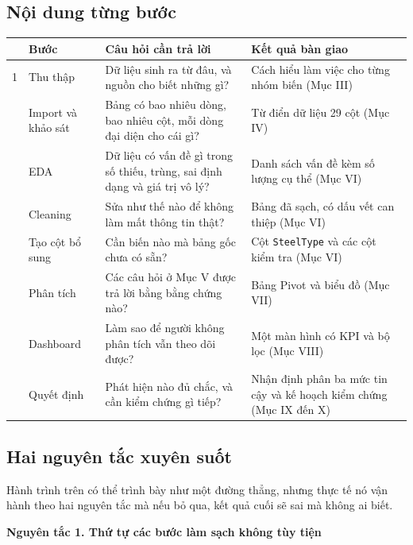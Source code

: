 \documentclass[12pt]{article}
\begin{document}
\subsection{Nội dung từng bước}

\begin{center}
\small
\begin{tabular}{@{}p{0.45cm} p{2.6cm} p{5.9cm} p{6.5cm}@{}}
\toprule
 & \textbf{Bước} & \textbf{Câu hỏi cần trả lời} & \textbf{Kết quả bàn giao} \\
\midrule
1 & Thu thập & Dữ liệu sinh ra từ đâu, và nguồn cho biết những gì? & Cách hiểu làm việc cho từng nhóm biến (Mục III) \\
\addlinespace[3pt]
2 & Import và khảo sát & Bảng có bao nhiêu dòng, bao nhiêu cột, mỗi dòng đại diện cho cái gì? & Từ điển dữ liệu 29 cột (Mục IV) \\
\addlinespace[3pt]
3 & EDA & Dữ liệu có vấn đề gì trong số thiếu, trùng, sai định dạng và giá trị vô lý? & Danh sách vấn đề kèm số lượng cụ thể (Mục VI) \\
\addlinespace[3pt]
4 & Cleaning & Sửa như thế nào để không làm mất thông tin thật? & Bảng đã sạch, có dấu vết can thiệp (Mục VI) \\
\addlinespace[3pt]
5 & Tạo cột bổ sung & Cần biến nào mà bảng gốc chưa có sẵn? & Cột \texttt{SteelType} và các cột kiểm tra (Mục VI) \\
\addlinespace[3pt]
6 & Phân tích & Các câu hỏi ở Mục V được trả lời bằng bằng chứng nào? & Bảng Pivot và biểu đồ (Mục VII) \\
\addlinespace[3pt]
7 & Dashboard & Làm sao để người không phân tích vẫn theo dõi được? & Một màn hình có KPI và bộ lọc (Mục VIII) \\
\addlinespace[3pt]
8 & Quyết định & Phát hiện nào đủ chắc, và cần kiểm chứng gì tiếp? & Nhận định phân ba mức tin cậy và kế hoạch kiểm chứng (Mục IX đến X) \\
\bottomrule
\end{tabular}
\end{center}

\subsection{Hai nguyên tắc xuyên suốt}

Hành trình trên có thể trình bày như một đường thẳng, nhưng thực tế nó vận hành theo hai nguyên tắc mà nếu bỏ qua, kết quả cuối sẽ sai mà không ai biết.\medskip

\noindent \textbf{Nguyên tắc 1. Thứ tự các bước làm sạch không tùy tiện}
\end{document}
